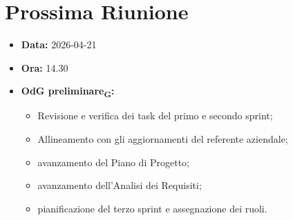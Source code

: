 \section{Prossima Riunione}
\begin{itemize}
	\item \textbf{Data:} 2026-04-21
	\item \textbf{Ora:} 14.30
	\item \textbf{OdG preliminare\textsubscript{G}:} 
	\begin{itemize}
		\item Revisione e verifica dei task del primo e secondo sprint;
		\item Allineamento con gli aggiornamenti del referente aziendale;
		\item avanzamento del Piano di Progetto;
		\item avanzamento dell'Analisi dei Requisiti;
		\item pianificazione del terzo sprint e assegnazione dei ruoli.
	\end{itemize} 
\end{itemize}